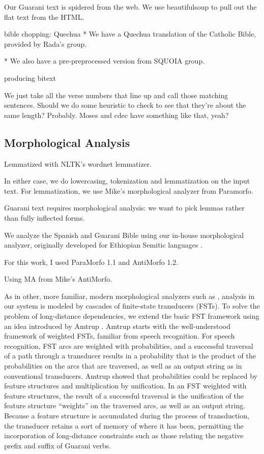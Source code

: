 Our Guarani text is spidered from the web. We use beautifulsoup to pull out the
flat text from the HTML.

bible chopping: Quechua
* We have a Quechua translation of the Catholic Bible, provided by Rada's group.

* We also have a pre-preprocessed version from SQUOIA group.


producing bitext

We just take all the verse numbers that line up and call those matching
sentences. Should we do some heuristic to check to see that they're about the
same length? Probably. Moses and cdec have something like that, yeah?  

\subsection{Morphological Analysis}
\label{sec:guaranima}
Lemmatized with NLTK's wordnet lemmatizer.


In either case, we do lowercasing, tokenization and lemmatization on the input
text. For lemmatization, we use Mike's morphological analyzer from Paramorfo.  

Guarani text requires morphological analysis: we want to pick lemmas rather
than fully inflected forms.



We analyze the Spanish and Guarani Bible using our in-house morphological
analyzer, originally developed for Ethiopian Semitic languages 
\cite{gasser:eacl09}.

For this work, I used ParaMorfo 1.1 and AntiMorfo 1.2.

Using MA from Mike's AntiMorfo.

As in other, more familiar, modern
morphological analyzers such as \cite{beesley+karttunen}, analysis in our
system is modeled by cascades of finite-state transducers (FSTs).  To solve the
problem of long-distance dependencies, we extend the basic FST framework using
an idea introduced by Amtrup \cite{amtrup:03}.  Amtrup starts with the
well-understood framework of weighted FSTs, familiar from speech recognition.
For speech recognition, FST arcs are weighted with probabilities, and a
successful traversal of a path through a transducer results in a probability
that is the product of the probabilities on the arcs that are traversed, as
well as an output string as in conventional transducers.  Amtrup showed that
probabilities could be replaced by feature structures and multiplication by
unification.  In an FST weighted with feature structures, the result of a
successful traversal is the unification of the feature structure ``weights'' on
the traversed arcs, as well as an output string.  Because a feature structure
is accumulated during the process of transduction, the transducer retains a
sort of memory of where it has been, permitting the incorporation of
long-distance constraints such as those relating the negative prefix and suffix
of Guarani verbs.

